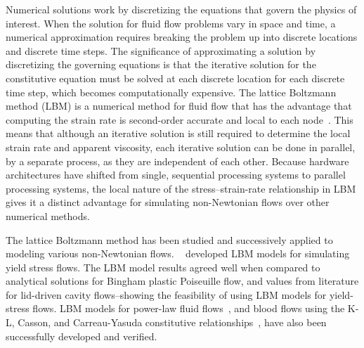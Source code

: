 \documentclass{article}
\begin{document}
Numerical solutions work by discretizing the equations that govern the physics of interest.
When the solution for fluid flow problems vary in space and time, a numerical approximation requires breaking the problem up into discrete locations and discrete time steps.
The significance of approximating a solution by discretizing the governing equations is that the iterative solution for the constitutive equation must be solved at each discrete location for each discrete time step, which becomes computationally expensive.
The lattice Boltzmann method (LBM) is a numerical method for fluid flow that has the advantage that computing the strain rate is second-order accurate and local to each node~\cite{kruger2010second}.
This means that although an iterative solution is still required to determine the local strain rate and apparent viscosity, each iterative solution can be done in parallel, by a separate process, as they are independent of each other.
Because hardware architectures have shifted from single, sequential processing systems to parallel processing systems, the local nature of the stress--strain-rate relationship in LBM gives it a distinct advantage for simulating non-Newtonian flows over other numerical methods.

The lattice Boltzmann method has been studied and successively applied to modeling various non-Newtonian flows.
~\citet{tang2011bingham,chai2011multiple,fallah2012multiple,chen2014simulations,vikhansky2008lattice,wang2008lattice} developed LBM models for simulating yield stress flows.
The LBM model results agreed well when compared to analytical solutions for Bingham plastic Poiseuille flow, and values from literature for lid-driven cavity flows--showing the feasibility of using LBM models for yield-stress flows.
LBM models for power-law fluid flows~\cite{wang2011lattice,wang2015localized,boyd2006second,chai2011multiple}, and blood flows using the K-L, Casson, and Carreau-Yasuda constitutive relationships~\cite{ashrafizaadeh2009comparison}, have also been successfully developed and verified.
\end{document}
